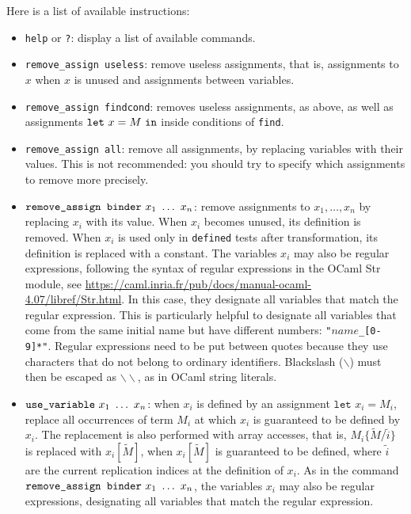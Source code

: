\documentclass{article}
\newcommand{\tup}[1]{\widetilde{#1}}
\begin{document}
Here is a list of available instructions:
\begin{itemize}

\item \texttt{help} or \texttt{?}: display a list of available commands.

\item \texttt{remove\string_assign useless}: remove useless assignments,
that is, assignments to $x$ when $x$ is unused and assignments
between variables.

\item \texttt{remove\string_assign findcond}: removes useless assignments,
as above, as well as assignments ${\tt let}\ x = M\ {\tt in}$ inside
conditions of {\tt find}. 

\item \texttt{remove\string_assign all}: remove all assignments,
by replacing variables with their values. This is not recommended:
you should try to specify which assignments to remove more precisely.

\item $\texttt{remove\string_assign binder}\ x_1\ \dots\ x_n$: remove assignments
to $x_1, \ldots, x_n$ by replacing $x_i$ with its value. When $x_i$ becomes unused,
its definition is removed. When $x_i$ is used only in \texttt{defined} 
tests after transformation, its definition is replaced with 
a constant. The variables $x_i$ may also be regular expressions, 
following the syntax of regular expressions in the OCaml Str module, see
  \url{https://caml.inria.fr/pub/docs/manual-ocaml-4.07/libref/Str.html}.
In this case, they designate all variables that match the regular expression.
This is particularly helpful to designate all variables that come
from the same initial name but have different numbers:
\texttt{"$\mathit{name}$\_[0-9]*"}. Regular expressions 
need to be put between quotes because they use characters that do
not belong to ordinary identifiers. Blackslash ($\backslash$) must then be escaped 
as $\backslash\backslash$, as in OCaml string literals.

\item $\texttt{use\string_variable}\ x_1\ \dots\ x_n$: when $x_i$ is defined
  by an assignment $\texttt{let }x_i = M_i$, replace all occurrences of term
  $M_i$ at which $x_i$ is guaranteed to be defined by $x_i$. The replacement
  is also performed with array accesses, that is, $M_i\{\tup{M}/\tup{i}\}$
  is replaced with $x_i[\tup{M}]$, when $x_i[\tup{M}]$ is guaranteed to be
  defined, where $\tup{i}$ are the current replication indices at the
  definition of $x_i$.
  As in the command $\texttt{remove\string_assign binder}\ x_1\ \dots\ x_n$,
  the variables $x_i$ may also be regular expressions, designating
  all variables that match the regular expression.


\end{itemize}
\end{document}
